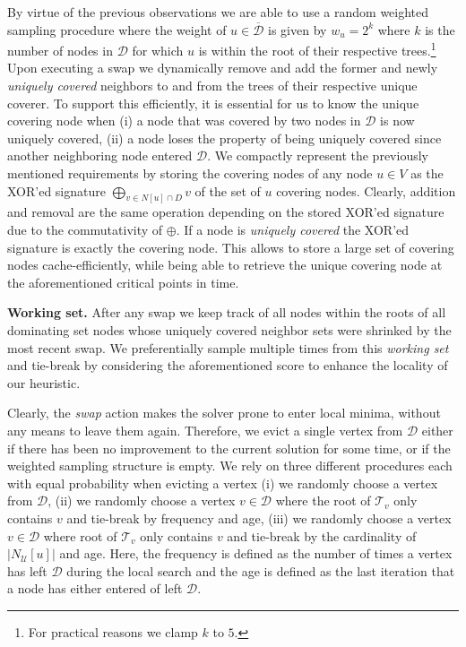 \documentclass[a4paper, USenglish, cleveref, autoref, thm-restate, noalgorithm2e]{socg-lipics-v2021}
\newcommand{\domset}{\ensuremath{\mathcal D}\xspace}
\newcommand{\uniquelycovered}{\ensuremath{\mathcal U}\xspace}
\newcommand{\intersectiontree}{\ensuremath{\mathcal T}\xspace}
\newcommand{\cdomset}{\ensuremath{\overline{\mathcal D}}\xspace}
\begin{document}
By virtue of the previous observations we are able to use a random weighted sampling procedure where the weight of $u \in \cdomset$ is given by $w_u = 2^{k}$ where $k$ is the number of nodes in $\domset$ for which $u$ is within the root of their respective trees.\footnote{For practical reasons we clamp $k$ to $5$.}
%
Upon executing a swap we dynamically remove and add the former and newly \textit{uniquely covered} neighbors to and from the trees of their respective unique coverer.
%
To support this efficiently, it is essential for us to know the unique covering node when (i) a node that was covered by two nodes in $\domset$ is now uniquely covered, (ii) a node loses the property of being uniquely covered since another neighboring node entered $\domset$.
%
We compactly represent the previously mentioned requirements by storing the covering nodes of any node $u \in V$ as the XOR'ed signature $\bigoplus_{v \in N[u]\cap D} v$ of the set of $u$ covering nodes.
%
Clearly, addition and removal are the same operation depending on the stored XOR'ed signature due to the commutativity of $\oplus$.
%
If a node is \textit{uniquely covered} the XOR'ed signature is exactly the covering node.
%
This allows to store a large set of covering nodes cache-efficiently, while being able to retrieve the unique covering node at the aforementioned critical points in time. 

\textbf{Working set.} After any swap we keep track of all nodes within the roots of all dominating set nodes whose uniquely covered neighbor sets were shrinked by the most recent swap.
%
We preferentially sample multiple times from this \textit{working set} and tie-break by considering the aforementioned score to enhance the locality of our heuristic.

Clearly, the \textit{swap} action makes the solver prone to enter local minima, without any means to leave them again.
%
Therefore, we evict a single vertex from $\domset$ either if there has been no improvement to the current solution for some time, or if the weighted sampling structure is empty.
%
We rely on three different procedures each with equal probability when evicting a vertex (i) we randomly choose a vertex from $\domset$, (ii) we randomly choose a vertex $v \in \domset$ where the root of $\intersectiontree_v$ only contains $v$ and tie-break by frequency and age, (iii) we randomly choose a vertex $v \in \domset$ where root of $\intersectiontree_v$ only contains $v$ and tie-break by the cardinality of $|N_{\uniquelycovered}[u]|$ and age.
%
Here, the frequency is defined as the number of times a vertex has left $\domset$ during the local search and the age is defined as the last iteration that a node has either entered of left $\domset$.   










\end{document}
